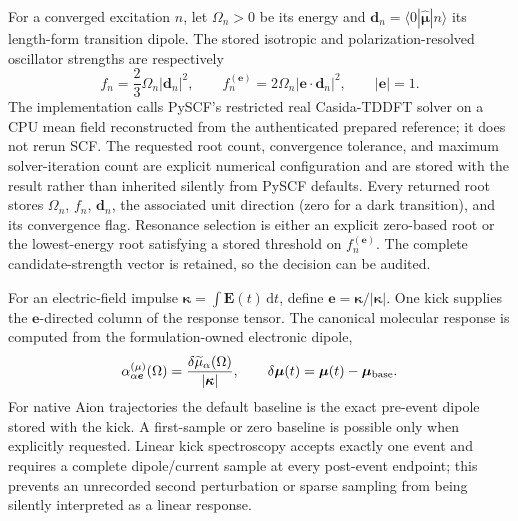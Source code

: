 \documentclass[11pt]{article}
\newcommand{\dd}{\mathrm{d}}
\newcommand{\vect}[1]{\bm{#1}}
\begin{document}
For a converged excitation \(n\), let \(\Omega_n>0\) be its energy and
\(\vect d_n=\langle 0|\hat{\vect\mu}|n\rangle\) its length-form transition
dipole. The stored isotropic and polarization-resolved oscillator strengths
are respectively
\begin{equation}
 f_n=\frac{2}{3}\Omega_n\lvert\vect d_n\rvert^2,
 \qquad
 f_n^{(\vect e)}=2\Omega_n\lvert\vect e\mathbin{\cdot}\vect d_n\rvert^2,
 \qquad \lvert\vect e\rvert=1.
 \label{eq:casida-strengths}
\end{equation}
The implementation calls PySCF's restricted real Casida-TDDFT solver on a
CPU mean field reconstructed from the authenticated prepared reference; it
does not rerun SCF. The requested root count, convergence tolerance, and
maximum solver-iteration count are explicit numerical configuration and are
stored with the result rather than inherited silently from PySCF defaults.
Every returned root stores \(\Omega_n\), \(f_n\),
\(\vect d_n\), the associated unit direction (zero for a dark transition),
and its convergence flag. Resonance selection is either an explicit zero-based
root or the lowest-energy root satisfying a stored threshold on
\(f_n^{(\vect e)}\). The complete candidate-strength vector is retained, so
the decision can be audited.

For an electric-field impulse
\(\vect\kappa=\int\vect E(t)\,\dd t\), define
\(\vect e=\vect\kappa/\lvert\vect\kappa\rvert\). One kick supplies the
\(\vect e\)-directed column of the response tensor. The canonical molecular
response is computed from the formulation-owned electronic dipole,
\begin{equation}
 \alpha_{\alpha\vect e}^{(\mu)}(\Omega)
 =\frac{\delta\widetilde\mu_\alpha(\Omega)}
        {\lvert\vect\kappa\rvert},
 \qquad
 \delta\vect\mu(t)=\vect\mu(t)-\vect\mu_{\rm base}.
 \label{eq:kick-alpha}
\end{equation}
For native Aion trajectories the default baseline is the exact pre-event
dipole stored with the kick. A first-sample or zero baseline is possible only
when explicitly requested. Linear kick spectroscopy accepts exactly one event
and requires a complete dipole/current sample at every post-event endpoint;
this prevents an unrecorded second perturbation or sparse sampling from being
silently interpreted as a linear response.
\end{document}
